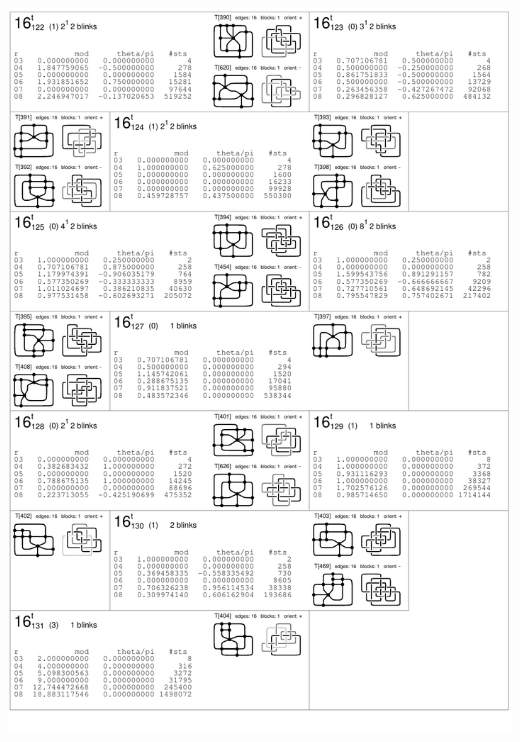 \begin{center}
 \includegraphics[height=23.5cm]{E.figsbw2/con3catalog027_bw.pdf} \eject

\end{center}
